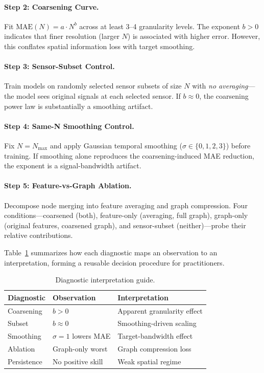 \documentclass[sigconf]{acmart}
\begin{document}
\paragraph{Step 2: Coarsening Curve.} Fit $\text{MAE}(N) = a \cdot N^b$ across at least 3--4 granularity levels. The exponent $b > 0$ indicates that finer resolution (larger $N$) is associated with higher error. However, this conflates spatial information loss with target smoothing.

\paragraph{Step 3: Sensor-Subset Control.} Train models on randomly selected sensor subsets of size $N$ with \textit{no averaging}---the model sees original signals at each selected sensor. If $b \approx 0$, the coarsening power law is substantially a smoothing artifact.

\paragraph{Step 4: Same-N Smoothing Control.} Fix $N = N_\text{max}$ and apply Gaussian temporal smoothing ($\sigma \in \{0, 1, 2, 3\}$) before training. If smoothing alone reproduces the coarsening-induced MAE reduction, the exponent is a signal-bandwidth artifact.

\paragraph{Step 5: Feature-vs-Graph Ablation.} Decompose node merging into feature averaging and graph compression. Four conditions---coarsened (both), feature-only (averaging, full graph), graph-only (original features, coarsened graph), and sensor-subset (neither)---probe their relative contributions.

Table~\ref{tab:interpretation} summarizes how each diagnostic maps an observation to an interpretation, forming a reusable decision procedure for practitioners.

\begin{table}[t]
\small
\centering
\caption{Diagnostic interpretation guide.}
\label{tab:interpretation}
\begin{tabularx}{\columnwidth}{@{}l>{\raggedright\arraybackslash}p{2.2cm}>{\raggedright\arraybackslash}X@{}}
\toprule
Diagnostic & Observation & Interpretation \\
\midrule
Coarsening & $b{>}0$ & Apparent granularity effect \\
\addlinespace
Subset & $b{\approx}0$ & Smoothing-driven scaling \\
\addlinespace
Smoothing & $\sigma{=}1$ lowers MAE & Target-bandwidth effect \\
\addlinespace
Ablation & Graph-only worst & Graph compression loss \\
\addlinespace
Persistence & No positive skill & Weak spatial regime \\
\bottomrule
\end{tabularx}
\end{table}
\end{document}
